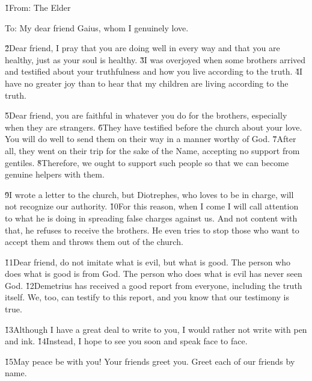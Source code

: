 


\v{1}From: The Elder

To: My dear friend Gaius, whom I genuinely love.

\v{2}Dear friend, I pray that you are doing well in every way and that you are healthy, just as your soul is healthy. \v{3}I was overjoyed when some brothers arrived and testified about your truthfulness and how you live according to the truth. \v{4}I have no greater joy than to hear that my children are living according to the truth.

\v{5}Dear friend, you are faithful in whatever you do for the brothers, especially when they are strangers. \v{6}They have testified before the church about your love. You will do well to send them on their way in a manner worthy of God. \v{7}After all, they went on their trip for the sake of the Name, accepting no support from gentiles. \v{8}Therefore, we ought to support such people so that we can become genuine helpers with them.

\v{9}I wrote a letter to the church, but Diotrephes, who loves to be in charge, will not recognize our authority. \v{10}For this reason, when I come I will call attention to what he is doing in spreading false charges against us. And not content with that, he refuses to receive the brothers. He even tries to stop those who want to accept them and throws them out of the church.

\v{11}Dear friend, do not imitate what is evil, but what is good. The person who does what is good is from God. The person who does what is evil has never seen God. \v{12}Demetrius has received a good report from everyone, including the truth itself. We, too, can testify to this report, and you know that our testimony is true.

\v{13}Although I have a great deal to write to you, I would rather not write with pen and ink. \v{14}Instead, I hope to see you soon and speak face to face.

\v{15}May peace be with you! Your friends greet you. Greet each of our friends by name.
